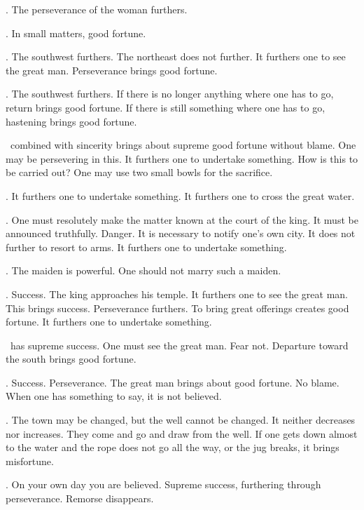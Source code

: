 {\nameit. The perseverance of the woman furthers.}

{\nameit. In small matters, good fortune.}

{\nameit. The southwest furthers.
 The northeast does not further.
 It furthers one to see the great man.
 Perseverance brings good fortune.}

{\nameit. The southwest furthers.
 If there is no longer anything where one has to go,
 return brings good fortune.
 If there is still something where one has to go,
 hastening brings good fortune.}

{\nameit\ combined with sincerity
 brings about supreme good fortune
 without blame.
 One may be persevering in this.
 It furthers one to undertake something.
 How is this to be carried out?
 One may use two small bowls for the sacrifice.}

{\nameit. It furthers one
 to undertake something.
 It furthers one to cross the great water.}

{\nameit. One must resolutely make the matter known
 at the court of the king.
 It must be announced truthfully. Danger.
 It is necessary to notify one’s own city.
 It does not further to resort to arms.
 It furthers one to undertake something.}

{\nameit. The maiden is powerful.
 One should not marry such a maiden.}

{\nameit. Success.
 The king approaches his temple.
 It furthers one to see the great man.
 This brings success. Perseverance furthers.
 To bring great offerings creates good fortune.
 It furthers one to undertake something.}

{\nameit\ has supreme success.
 One must see the great man.
 Fear not.
 Departure toward the south
 brings good fortune.}

{\nameit. Success. Perseverance.
 The great man brings about good fortune.
 No blame.
 When one has something to say,
 it is not believed.}

{\nameit. The town may be changed,
 but the well cannot be changed.
 It neither decreases nor increases.
 They come and go and draw from the well.
 If one gets down almost to the water
 and the rope does not go all the way,
 or the jug breaks, it brings misfortune.}

{\nameit. On your own day
 you are believed.
 Supreme success,
 furthering through perseverance.
 Remorse disappears.}

